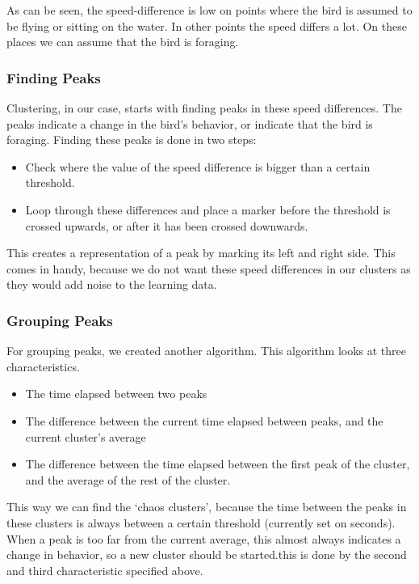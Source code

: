 
As can be seen, the speed-difference is low on points where the bird is assumed
to be flying or sitting on the water. In other points the speed differs a lot.
On these places we can assume that the bird is foraging.


\subsubsection{Finding Peaks}
 Clustering, in our case, starts with finding peaks in these speed differences.
 The peaks indicate a change in the bird's behavior, or indicate that the bird
 is foraging. Finding these peaks is done in two steps:

 \begin{itemize}
    \item Check where the value of the speed difference is bigger than a certain
    threshold.
    \item Loop through these differences and place a marker before the threshold
    is crossed upwards, or after it has been crossed downwards. 
 \end{itemize}
 
 This creates a representation of a peak by marking its left and right side.
 This comes in handy, because we do not want these speed differences in our
 clusters as they would add noise to the learning data.

 \subsubsection{Grouping Peaks}
 For grouping peaks, we created another algorithm. This algorithm looks at three
 characteristics.  
 \begin{itemize}
 \item The time elapsed between two peaks
 \item The difference between the current time elapsed between peaks, and the
 current cluster's average
 \item The difference between the time elapsed between the first peak of the
 cluster, and the average of the rest of the cluster.
 \end{itemize}
 This way we can find the `chaos clusters', because the time between the peaks
 in these clusters is always between a certain threshold (currently set on
 \timeThreshold seconds). 
 When a peak is too far from the  current average, this almost always indicates
 a change in behavior, so a new cluster should be started.this is done by the
 second and third characteristic specified above.


